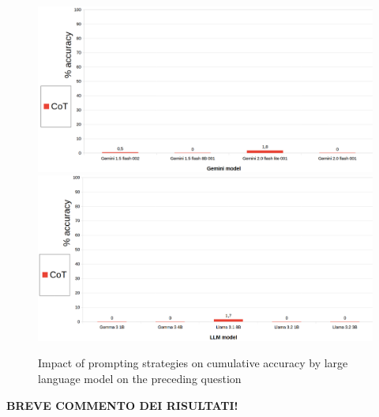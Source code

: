 \documentclass[12pt]{article}
\begin{document}
\begin{figure}[H]
    \centering
            \includegraphics[width=1\textwidth]{q303Gemini.png}
            \includegraphics[width=1\textwidth]{q303Other.png}
    \caption[Accuracy on Question 15 by LLM]{Impact of prompting strategies on cumulative accuracy by large language model on the preceding question}
    \end{figure} 
\textbf{BREVE COMMENTO DEI RISULTATI!}

\vspace{1cm}
\end{document}
